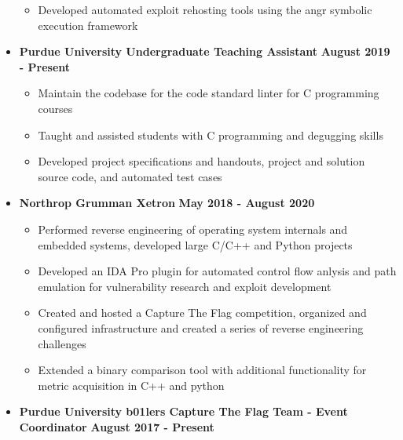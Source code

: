 \documentclass[letterpaper,10pt]{article}
\begin{document}
\begin{flushleft}
\begin{itemize}
            \begin{itemize}
                \item Developed automated exploit rehosting tools using the angr symbolic execution framework \\
            \end{itemize}
        \item \textbf{Purdue University Undergraduate Teaching Assistant} \hfill \textbf{August 2019 - Present} \\
            \begin{itemize}
                \item Maintain the codebase for the code standard linter for C programming courses \\
                \item Taught and assisted students with C programming and degugging skills \\
                \item Developed project specifications and handouts, project and solution source code, and automated test cases \\
            \end{itemize}
		\item \textbf{Northrop Grumman Xetron} \hfill \textbf{May 2018 - August 2020} \\
			\begin{itemize}
                \item Performed reverse engineering of operating system internals and embedded systems, developed large C/C++ and Python projects \\
				\item Developed an IDA Pro plugin for automated control flow anlysis and path emulation for vulnerability research and exploit development \\
				\item Created and hosted a Capture The Flag competition, organized and configured infrastructure and created a series of reverse engineering challenges \\
				\item Extended a binary comparison tool with additional functionality for metric acquisition in C++ and python \\
			\end{itemize}
		\item \textbf{Purdue University b01lers Capture The Flag Team - Event Coordinator} \hfill \textbf{August 2017 - Present} \\

\end{itemize}
\end{flushleft}
\end{document}
